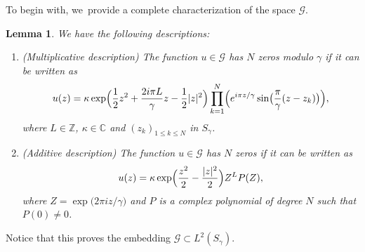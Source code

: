\documentclass[10pt]{amsart}
\newtheorem{lemme}[theorem]{Lemma}
\theoremstyle{definition}
\let\EE\exp
\newcommand\C{\mathbb C}
\begin{document}
To begin with, we~provide a complete characterization of the space $\mathcal{G}$.
\begin{lemme} \label{lem77}
We have the following descriptions:
\begin{enumerate}
\item (Multiplicative description) The function $u \in \mathcal{G}$ has $N$ zeros modulo $\gamma$ if it can be written as\vspace*{-3pt}
\begin{equation*}
u(z)=\kappa \EE\Bigl({\frac{1}{2} z^2 +\frac{2i\pi L}{\gamma}z- \frac{1}{2} |z|^2} \Bigr) \prod_{k=1}^N\Bigl(e^{{i\pi z}/{\gamma} }\sin\bigl(\frac{\pi}{\gamma}(z-z_k)\bigr)\Bigr),
\end{equation*}
where $L \in\mathbb{Z}$, $\kappa \in \C$ and $(z_k)_{1\leq k\leq N}$ in $S_\gamma$.
\item (Additive description) The function $u \in \mathcal{G}$ has $N$ zeros if it can be written as\vspace*{-3pt}
\begin{equation*}
u(z)=\kappa \EE\Bigl(\frac{z^2}2 - \frac{|z|^2}2\Bigr) Z^L P(Z),
\end{equation*}
where $Z = \EE\bigl({{2\pi i z}/{\gamma}}\bigr)$ and $P$ is a complex polynomial of degree $N$ such that ${P(0) \neq 0}$.
\end{enumerate}
\end{lemme}

Notice that this proves the embedding $\mathcal{G} \subset L^2(S_{\gamma})$.
\end{document}
